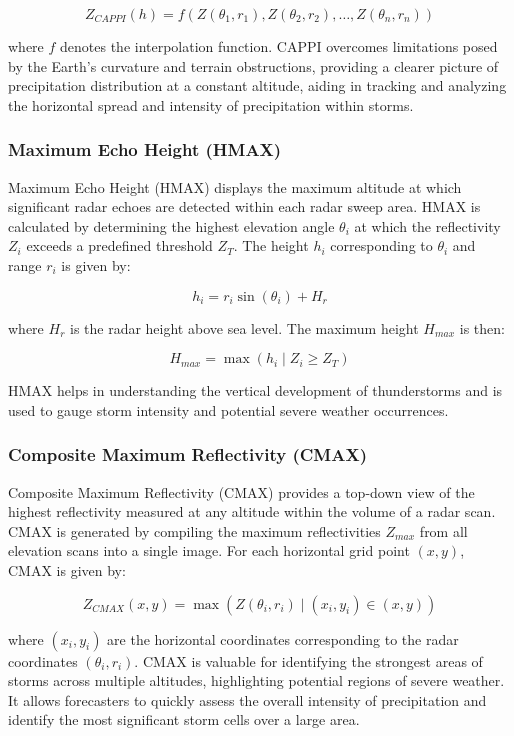 \[
Z_{CAPPI}(h) = f(Z(\theta_1, r_1), Z(\theta_2, r_2), \ldots, Z(\theta_n, r_n))
\]

where $f$ denotes the interpolation function. CAPPI overcomes limitations posed
by the Earth's curvature and terrain obstructions, providing a clearer picture
of precipitation distribution at a constant altitude, aiding in tracking and
analyzing the horizontal spread and intensity of precipitation within storms.

\subsubsection{Maximum Echo Height (HMAX)}

Maximum Echo Height (HMAX) displays the maximum altitude at which significant
radar echoes are detected within each radar sweep area. HMAX is calculated by
determining the highest elevation angle $\theta_i$ at which the reflectivity
$Z_i$ exceeds a predefined threshold $Z_T$. The height $h_i$ corresponding to
$\theta_i$ and range $r_i$ is given by:

\[
h_i = r_i \sin(\theta_i) + H_r
\]

where $H_r$ is the radar height above sea level. The maximum height $H_{max}$ is
then:

\[
H_{max} = \max(h_i \mid Z_i \geq Z_T)
\]

HMAX helps in understanding the vertical development of thunderstorms and is
used to gauge storm intensity and potential severe weather occurrences.

\subsubsection{Composite Maximum Reflectivity (CMAX)}

Composite Maximum Reflectivity (CMAX) provides a top-down view of the highest
reflectivity measured at any altitude within the volume of a radar scan. CMAX is
generated by compiling the maximum reflectivities $Z_{max}$ from all elevation
scans into a single image. For each horizontal grid point $(x, y)$, CMAX is
given by:

\[
Z_{CMAX}(x, y) = \max(Z(\theta_i, r_i) \mid (x_i, y_i) \in (x, y))
\]

where $(x_i, y_i)$ are the horizontal coordinates corresponding to the radar
coordinates $(\theta_i, r_i)$. CMAX is valuable for identifying the strongest
areas of storms across multiple altitudes, highlighting potential regions of
severe weather. It allows forecasters to quickly assess the overall intensity of
precipitation and identify the most significant storm cells over a large area.


